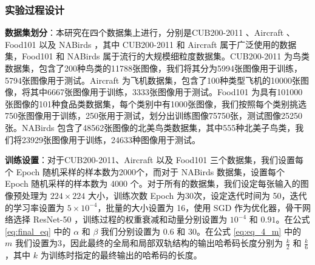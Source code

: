 \subsubsection{实验过程设计}

\textbf{数据集划分}：本研究在四个数据集上进行，分别是CUB200-2011 \cite{Wah2011TheCB}、Aircraft \cite{maji2013finegrained}、Food101 \cite{food101_2014} 以及 NABirds \cite{nabirds2015}，其中 CUB200-2011 和 Aircraft 属于广泛使用的数据集，Food101 和 NABirds 属于流行的大规模细粒度数据集。CUB200-2011 为鸟类数据集，包含了200种鸟类的11788张图像，我们将其分为5994张图像用于训练，5794张图像用于测试。Aircraft 为飞机数据集，包含了100种类型飞机的10000张图像，将其中6667张图像用于训练，3333张图像用于测试。Food101 为具有101000张图像的101种食品类数据集，每个类别中有1000张图像，我们按照每个类别挑选750张图像用于训练，250张用于测试，划分出训练图像75750张，测试图像25250张。NABirds 包含了48562张图像的北美鸟类数据集，其中555种北美子鸟类，我们将23929张图像用于训练，24633种图像用于测试。

\textbf{训练设置}：对于CUB200-2011、Aircraft 以及 Food101 三个数据集，我们设置每个 Epoch 随机采样的样本数为2000个，而对于 NABirds 数据集，设置每个 Epoch 随机采样的样本数为 4000 个。对于所有的数据集，我们设定每张输入的图像预处理为 $224 \times 224$ 大小，训练次数 Epoch 为30次，设定迭代时间为 50，迭代的学习率设置为 $5 \times 10^{-4}$，批量的大小设置为 16，使用 SGD 作为优化器，骨干网络选择 ResNet-50 \cite{he2015deep}，训练过程的权重衰减和动量分别设置为 $10^{-4}$ 和 $0.91$。在公式 \ref{eq:final_eq} 中的 $\alpha$ 和 $\beta$ 我们分别设置为 $0.6$ 和 $30$。在公式 \ref{eq:eq_4_m} 中的 $m$ 我们设置为3，因此最终的全局和局部双轨结构的输出哈希码长度分别为 $\frac{k}{2}$ 和 $\frac{k}{6}$，其中 $k$ 为训练时指定的最终输出的哈希码的长度。


